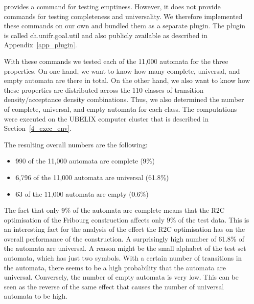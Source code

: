 \goal{} provides a command for testing emptiness. However, it does not provide commands for testing completeness and universality. We therefore implemented these commands on our own and bundled them as a separate \goal{} plugin. The plugin is called \textsf{ch.unifr.goal.util} and also publicly available as described in Appendix~\ref{app_plugin}.

With these \goal{} commands we tested each of the 11,000 automata for the three properties. On one hand, we want to know how many complete, universal, and empty automata are there in total. On the other hand, we also want to know how these properties are distributed across the 110 classes of transition density/acceptance density combinations. Thus, we also determined the number of complete, universal, and empty automata for each class. The computations were executed on the UBELIX computer cluster that is described in Section~\ref{4_exec_env}.

The resulting overall numbers are the following:
\begin{itemize}
\item 990 of the 11,000 automata are complete (9\%)
\item 6,796 of the 11,000 automata are universal (61.8\%)
\item 63 of the 11,000 automata are empty (0.6\%)
\end{itemize}

The fact that only 9\% of the automata are complete means that the R2C optimisation of the Fribourg construction affects only 9\% of the test data. This is an interesting fact for the analysis of the effect the R2C optimisation has on the overall performance of the construction. A surprisingly high number of 61.8\% of the automata are universal. A reason might be the small alphabet of the \goal{} test set automata, which has just two symbols. With a certain number of transitions in the automata, there seems to be a high probability that the automata are universal. Conversely, the number of empty automata is very low. This can be seen as the reverse of the same effect that causes the number of universal automata to be high.

